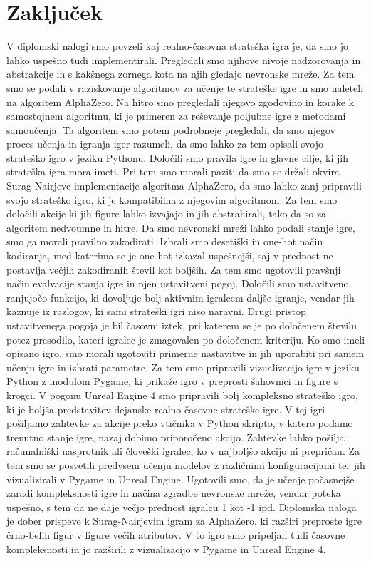 \documentclass[a4paper, 12pt]{book}
\begin{document}
\chapter{Zaključek}
\label{chzakljucek}
V diplomski nalogi smo povzeli kaj realno-časovna strateška igra je, da smo jo lahko uspešno tudi implementirali.
Pregledali smo njihove nivoje nadzorovanja in abstrakcije in s kakšnega zornega kota na njih gledajo nevronske mreže.
Za tem smo se podali v raziskovanje algoritmov za učenje te strateške igre in smo naleteli na algoritem AlphaZero.
Na hitro smo pregledali njegovo zgodovino in korake k samostojnem algoritmu, ki je primeren za reševanje poljubne igre z metodami samoučenja.
Ta algoritem smo potem podrobneje pregledali, da smo njegov proces učenja in igranja iger razumeli, da smo lahko za tem opisali svojo strateško igro v jeziku Pythonu.
Določili smo pravila igre in glavne cilje, ki jih strateška igra mora imeti.
Pri tem smo morali paziti da smo se držali okvira Surag-Nairjeve implementacije algoritma AlphaZero, da smo lahko zanj pripravili svojo strateško igro, ki je kompatibilna z njegovim algoritmom.
Za tem smo določili akcije ki jih figure lahko izvajajo in jih abstrahirali, tako da so za algoritem nedvoumne in hitre.
Da smo nevronski mreži lahko podali stanje igre, smo ga morali pravilno zakodirati.
Izbrali smo desetiški in one-hot način kodiranja, med katerima se je one-hot izkazal uspešnejši, saj v prednost ne postavlja večjih zakodiranih števil kot boljših.
Za tem smo ugotovili pravšnji način evalvacije stanja igre in njen ustavitveni pogoj.
Določili smo ustavitveno ranjujočo funkcijo, ki dovoljuje bolj aktivnim igralcem daljše igranje, vendar jih kaznuje iz razlogov, ki sami strateški igri niso naravni.
Drugi pristop ustavitvenega pogoja je bil časovni iztek, pri katerem se je po določenem številu potez presodilo, kateri igralec je zmagovalen po določenem kriteriju.
Ko smo imeli opisano igro, smo morali ugotoviti primerne nastavitve in jih uporabiti pri samem učenju igre in izbrati parametre.
Za tem smo pripravili vizualizacijo igre v jeziku Python z modulom Pygame, ki prikaže igro v preprosti šahovnici in figure s krogci.
V pogonu Unreal Engine 4 smo pripravili bolj kompleksno strateško igro, ki je boljša predstavitev dejanske realno-časovne strateške igre.
V tej igri pošiljamo zahtevke za akcije preko vtičnika v Python skripto, v katero podamo trenutno stanje igre, nazaj dobimo priporočeno akcijo.
Zahtevke lahko pošilja računalniški nasprotnik ali človeški igralec, ko v najboljšo akcijo ni prepričan.
Za tem smo se posvetili predvsem učenju modelov z različnimi konfiguracijami ter jih vizualizirali v Pygame in Unreal Engine.
Ugotovili smo, da je učenje počasnejše zaradi kompleksnosti igre in načina zgradbe nevronske mreže, vendar poteka uspešno, s tem da ne daje večjo prednost igralcu 1 kot -1 ipd.
Diplomska naloga je dober prispeve k Surag-Nairjevim igram za AlphaZero, ki razširi preproste igre črno-belih figur v figure večih atributov.
V to igro smo pripeljali tudi časovne kompleksnosti in jo razširili z vizualizacijo v Pygame in Unreal Engine 4.
\end{document}
